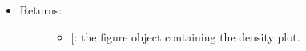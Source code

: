 \documentclass[letterpaper,10pt,english]{sphinxmanual}
\begin{document}
\begin{fulllineitems}
\begin{itemize}
\item {} \begin{description}
\item[{Returns:}] \leavevmode\begin{itemize}
\item {} 
{[}\sphinxstyleemphasis{matplotlib.figure.Figure}{]}: the figure object containing the
density plot.

\end{itemize}

\end{description}

\end{itemize}

\end{fulllineitems}

\end{document}
